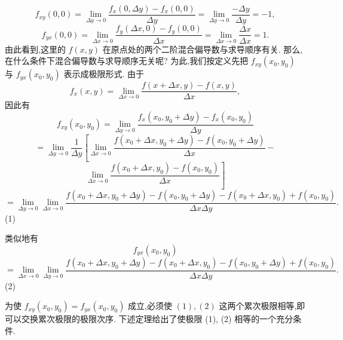 \[
{f}_{xy}\left( {0,0}\right)  = \mathop{\lim }\limits_{{{\Delta y} \rightarrow  0}}\frac{{f}_{x}\left( {0,{\Delta y}}\right)  - {f}_{x}\left( {0,0}\right) }{\Delta y} = \mathop{\lim }\limits_{{{\Delta y} \rightarrow  0}}\frac{-{\Delta y}}{\Delta y} =  - 1,
\]
\[
{f}_{yx}\left( {0,0}\right)  = \mathop{\lim }\limits_{{{\Delta x} \rightarrow  0}}\frac{{f}_{y}\left( {{\Delta x},0}\right)  - {f}_{y}\left( {0,0}\right) }{\Delta x} = \mathop{\lim }\limits_{{{\Delta x} \rightarrow  0}}\frac{\Delta x}{\Delta x} = 1.
\]
由此看到,这里的 \(f\left( {x,y}\right)\) 在原点处的两个二阶混合偏导数与求导顺序有关. 那么,在什么条件下混合偏导数与求导顺序无关呢? 为此,我们按定义先把 \({f}_{xy}\left( {{x}_{0},{y}_{0}}\right)\) 与 \({f}_{yx}\left( {{x}_{0},{y}_{0}}\right)\) 表示成极限形式. 由于
\[
{f}_{x}\left( {x,y}\right)  = \mathop{\lim }\limits_{{{\Delta x} \rightarrow  0}}\frac{f\left( {x + {\Delta x},y}\right)  - f\left( {x,y}\right) }{\Delta x},
\]
因此有
\[
{f}_{xy}\left( {{x}_{0},{y}_{0}}\right)  = \mathop{\lim }\limits_{{{\Delta y} \rightarrow  0}}\frac{{f}_{x}\left( {{x}_{0},{y}_{0} + {\Delta y}}\right)  - {f}_{x}\left( {{x}_{0},{y}_{0}}\right) }{\Delta y}
\]
\[
= \mathop{\lim }\limits_{{{\Delta y} \rightarrow  0}}\frac{1}{\Delta y}\left\lbrack  {\mathop{\lim }\limits_{{{\Delta x} \rightarrow  0}}\frac{f\left( {{x}_{0} + {\Delta x},{y}_{0} + {\Delta y}}\right)  - f\left( {{x}_{0},{y}_{0} + {\Delta y}}\right) }{\Delta x} - }\right.
\]
\[
\left. {\mathop{\lim }\limits_{{{\Delta x} \rightarrow  0}}\frac{f\left( {{x}_{0} + {\Delta x},{y}_{0}}\right)  - f\left( {{x}_{0},{y}_{0}}\right) }{\Delta x}}\right\rbrack
\]
\[
= \mathop{\lim }\limits_{{{\Delta y} \rightarrow  0}}\mathop{\lim }\limits_{{{\Delta x} \rightarrow  0}}\frac{f\left( {{x}_{0} + {\Delta x},{y}_{0} + {\Delta y}}\right)  - f\left( {{x}_{0},{y}_{0} + {\Delta y}}\right)  - f\left( {{x}_{0} + {\Delta x},{y}_{0}}\right)  + f\left( {{x}_{0},{y}_{0}}\right) }{\Delta x\Delta y}.
\]
(1)

类似地有
\[
{f}_{yx}\left( {{x}_{0},{y}_{0}}\right)
\]
\[
= \mathop{\lim }\limits_{{{\Delta x} \rightarrow  0}}\mathop{\lim }\limits_{{{\Delta y} \rightarrow  0}}\frac{f\left( {{x}_{0} + {\Delta x},{y}_{0} + {\Delta y}}\right)  - f\left( {{x}_{0} + {\Delta x},{y}_{0}}\right)  - f\left( {{x}_{0},{y}_{0} + {\Delta y}}\right)  + f\left( {{x}_{0},{y}_{0}}\right) }{\Delta x\Delta y}.
\]
(2)

为使 \({f}_{xy}\left( {{x}_{0},{y}_{0}}\right)  = {f}_{yx}\left( {{x}_{0},{y}_{0}}\right)\) 成立,必须使 \(\left( 1\right) ,\left( 2\right)\) 这两个累次极限相等,即可以交换累次极限的极限次序. 下述定理给出了使极限 (1), (2) 相等的一个充分条件.

